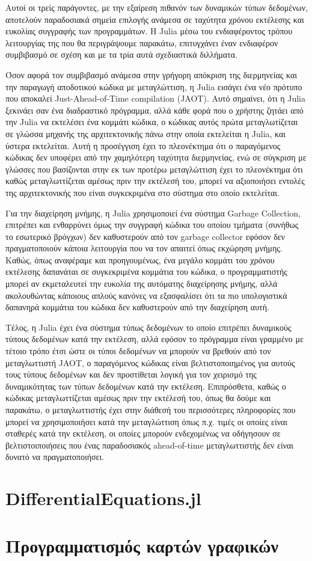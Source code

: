 Αυτοί οι τρείς παράγοντες, με την εξαίρεση πιθανόν των δυναμικών τύπων δεδομένων, αποτελούν παραδοσιακά σημεία επιλογής ανάμεσα σε ταχύτητα χρόνου εκτέλεσης και ευκολίας συγγραφής των προγραμμάτων.
Η Julia μέσω του ενδιαφέροντος τρόπου λειτουργίας της που θα περιγράψουμε παρακάτω, επιτυγχάνει έναν ενδιαφέρον συμβιβασμό σε σχέση και με τα τρία αυτά σχεδιαστικά διλλήματα.

Όσον αφορά τον συμβιβασμό ανάμεσα στην γρήγορη απόκριση της διερμηνείας και την παραγωγή αποδοτικού κώδικα με μεταγλώττιση, η Julia εισάγει ένα νέο πρότυπο που αποκαλεί Just-Ahead-of-Time compilation (JAOT).
Αυτό σημαίνει, ότι η Julia ξεκινάει σαν ένα διαδραστικό πρόγραμμα, αλλά κάθε φορά που ο χρήστης ζητάει από την Julia να εκτελέσει ένα κομμάτι κώδικα, ο κώδικας αυτός πρώτα μεταγλωτίζεται σε γλώσσα μηχανής της αρχιτεκτονικής πάνω στην οποία εκτελείται η Julia, και ύστερα εκτελείται.
Αυτή η προσέγγιση έχει το πλεονέκτημα ότι ο παραγόμενος κώδικας δεν υποφέρει από την χαμηλότερη ταχύτητα διερμηνείας, ενώ σε σύγκριση με γλώσσες που βασίζονται στην εκ των προτέρω μεταγλώττιση έχει το πλεονέκτημα ότι καθώς μεταγλωττίζεται αμέσως πριν την εκτέλεσή του, μπορεί να αξιοποιήσει εντολές της αρχιτεκτονικής που είναι συγκεκριμένα στο σύστημα στο οποίο εκτελείται.

Για την διαχείρηση μνήμης, η Julia χρησιμοποιεί ένα σύστημα Garbage Collection, επιτρέπει και ενθαρρύνει όμως την συγγραφή κώδικα του οποίου τμήματα (συνήθως το εσωτερικό βρόγχων) δεν καθυστερούν από τον garbage collector εφόσον δεν πραγματοποιούν κάποια λειτουργία που να τον απαιτεί όπως εκχώρηση μνήμης.
Καθώς, όπως αναφέραμε και προηγουμένως, ένα μεγάλο κομμάτι του χρόνου εκτέλεσης δαπανάται σε συγκεκριμένα κομμάτια του κώδικα, ο προγραμματιστής μπορεί αν εκμεταλευτεί την ευκολία της αυτόματης διαχείρησης μνήμης, αλλά ακολουθώντας κάποιους απλούς κανόνες να εξασφαλίσει ότι τα πιο υπολογιστικά δαπανηρά κομμάτια του κώδικα δεν καθυστερούν από την διαχείρηση αυτή.

Τέλος, η Julia έχει ένα σύστημα τύπως δεδομένων το οποίο επιτρέπει δυναμικούς τύπους δεδομένων κατά την εκτέλεση, αλλά εφόσον το πρόγραμμα είναι γραμμένο με τέτοιο τρόπο έτσι ώστε οι τύποι δεδομένων να μπορούν να βρεθούν από τον μεταγλωττιστή JAOT, ο παραγόμενος κώδικας είναι βελτιστοποιημένος για αυτούς τους τύπους δεδομένων και δεν προστίθεται λογική για τον χειρισμό της δυναμικότητας των τύπων δεδομένων κατά την εκτέλεση.
Επιπρόσθετα, καθώς ο κώδικας μεταγλωττίζεται αμέσως πριν την εκτέλεσή του, όπως θα δούμε και παρακάτω, ο μεταγλωττιστής έχει στην διάθεσή του περισσότερες πληροφορίες που μπορεί να χρησιμοποιήσει κατά την μεταγλώττιση όπως π.χ. τιμές οι οποίες είναι σταθερές κατά την εκτέλεση, οι οποίες μπορούν ενδεχομένως να οδήγησουν σε βελτιστοιποιήσεις που ένας παραδοσιακός ahead-of-time μεταγλωττιστής δεν είναι δυνατό να πραγματοποιήσει.


\section{DifferentialEquations.jl}


\section{Προγραμματισμός καρτών γραφικών}

